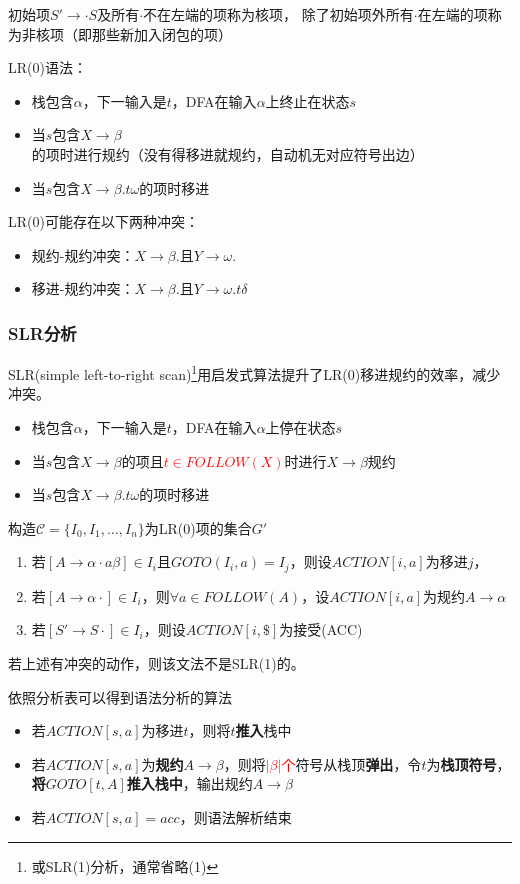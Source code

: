 \begin{definition}
初始项$S'\to\cdot S$及所有$\cdot$不在左端的项称为核项，
除了初始项外所有$\cdot$在左端的项称为非核项（即那些新加入闭包的项）
\end{definition}

LR(0)语法：
\begin{itemize}
	\item 栈包含$\alpha$，下一输入是$t$，DFA在输入$\alpha$上终止在状态$s$
	\item 当$s$包含$X\to\beta$的项时进行规约（没有得移进就规约，自动机无对应符号出边）
	\item 当$s$包含$X\to\beta.t\omega$的项时移进
\end{itemize}

LR(0)可能存在以下两种冲突：
\begin{itemize}
	\item 规约-规约冲突：$X\to\beta.$且$Y\to\omega.$
	\item 移进-规约冲突：$X\to\beta.$且$Y\to\omega.t\delta$
\end{itemize}

\subsubsection{SLR分析}
SLR(simple left-to-right scan)\footnote{或SLR(1)分析，通常省略(1)}用启发式算法提升了LR(0)移进规约的效率，减少冲突。
\begin{itemize}
	\item 栈包含$\alpha$，下一输入是$t$，DFA在输入$\alpha$上停在状态$s$
	\item 当$s$包含$X\to\beta$的项且\textcolor{red}{$t\in FOLLOW(X)$}时进行$X\to\beta$规约
	\item 当$s$包含$X\to\beta.t\omega$的项时移进
\end{itemize}

\begin{myalgorithm}
构造$\mathcal{C}=\{I_0,I_1,\ldots,I_n\}$为LR(0)项的集合$G'$
\begin{enumerate}
	\item 若$[A\to\alpha\cdot a \beta]\in I_i$且$GOTO(I_i,a)=I_j$，则设$ACTION[i,a]$为移进$j$，
	\item 若$[A\to\alpha\cdot]\in I_i$，则$\forall a\in FOLLOW(A)$，设$ACTION[i,a]$为规约$A\to\alpha$
	\item 若$[S'\to S\cdot]\in I_i$，则设$ACTION[i,\$]$为接受(ACC)
\end{enumerate}
若上述有冲突的动作，则该文法不是SLR(1)的。

依照分析表可以得到语法分析的算法
\begin{itemize}
	\item 若$ACTION[s,a]$为移进$t$，则将$t$\textbf{推入}栈中
	\item 若$ACTION[s,a]$为\textbf{规约$A\to\beta$}，则将\textcolor{red}{$|\beta|$个}符号从栈顶\textbf{弹出}，令$t$为\textbf{栈顶符号}，\textbf{将$GOTO[t,A]$推入栈中}，输出规约$A\to\beta$
	\item 若$ACTION[s,a]=acc$，则语法解析结束
\end{itemize}
\end{myalgorithm}

